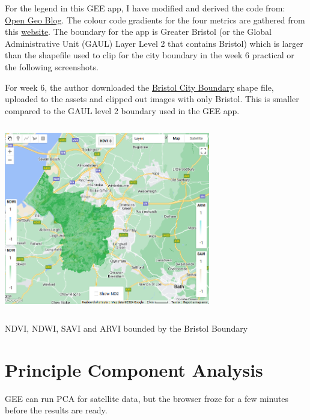 \documentclass[
  letterpaper,
  DIV=11,
  numbers=noendperiod]{scrreprt}
\begin{document}
For the legend in this GEE app, I have modified and derived the code
from:
\href{https://mygeoblog.com/2016/12/09/add-a-legend-to-to-your-gee-map/}{Open
Geo Blog}. The colour code gradients for the four metrics are gathered
from this \href{https://www.color-hex.com/}{website}. The boundary for
the app is Greater Bristol (or the Global Administrative Unit (GAUL)
Layer Level 2 that contains Bristol) which is larger than the shapefile
used to clip for the city boundary in the week 6 practical or the
following screenshots.

For week 6, the author downloaded the
\href{https://opendata.bristol.gov.uk/datasets/bcc::bristol-boundary/explore}{Bristol
City Boundary} shape file, uploaded to the assets and clipped out images
with only Bristol. This is smaller compared to the GAUL level 2 boundary
used in the GEE app.

\includegraphics[width=3.54167in,height=3.22917in]{images/wk6/wk6_ndvi.png}

NDVI, NDWI, SAVI and ARVI bounded by the Bristol Boundary

\hypertarget{principle-component-analysis}{%
\section*{Principle Component
Analysis}\label{principle-component-analysis}}


GEE can run PCA for satellite data, but the browser froze for a few
minutes before the results are ready.
\end{document}
